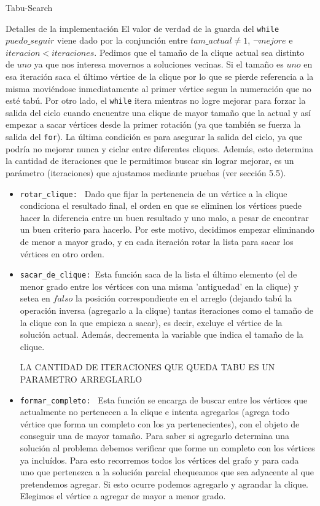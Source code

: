 \begin{section}{Tabu-Search}
\begin{subsection}{Detalles de la implementación}
		El valor de verdad de la guarda del \texttt{while} $puedo\_seguir$ viene dado por la conjunción entre $tam\_actual \neq 1$, $\neg mejore$ e $iteracion<iteraciones$.
		Pedimos que el tamaño de la clique actual sea distinto de $uno$ ya que nos interesa movernos a soluciones vecinas. Si el tamaño es $uno$ en esa iteración saca el último vértice de la clique por lo que se pierde referencia a la misma moviéndose inmediatamente al primer vértice segun la numeración que no esté tabú.
		Por otro lado, el \texttt{while} itera mientras no logre mejorar para forzar la salida del ciclo cuando encuentre una clique de mayor tamaño que la actual y así empezar a sacar vértices desde la primer rotación (ya que también se fuerza la salida del \texttt{for}).
		La última condición es para asegurar la salida del ciclo, ya que podría no mejorar nunca y ciclar entre diferentes cliques. Además, esto determina la cantidad de iteraciones que le permitimos buscar sin lograr mejorar, es un parámetro (iteraciones) que ajustamos mediante pruebas (ver sección 5.5).
		\begin{itemize}			
			\item \texttt{rotar\_clique: } Dado que fijar la pertenencia de un vértice a la clique condiciona el resultado final, el orden en que se eliminen los vértices puede hacer la diferencia entre un buen resultado y uno malo, a pesar de encontrar un buen criterio para hacerlo. Por este motivo, decidimos empezar eliminando de menor a mayor grado, y en cada iteración rotar la lista para sacar los vértices en otro orden.
			
			\item \texttt{sacar\_de\_clique: }Esta función saca de la lista el último elemento (el de menor grado entre los vértices con una misma 'antiguedad' en la clique) y setea en $falso$ la posición correspondiente en el arreglo (dejando tabú la operación inversa (agregarlo a la clique) tantas iteraciones como el tamaño de la clique con la que empieza a sacar), es decir, excluye el vértice de la solución actual. Además, decrementa la variable que indica el tamaño de la clique.

			LA CANTIDAD DE ITERACIONES QUE QUEDA TABU ES UN PARAMETRO ARREGLARLO
			
			\item \texttt{formar\_completo: } Esta función se encarga de buscar entre los vértices que actualmente no pertenecen a la clique e intenta agregarlos (agrega todo vértice que forma un completo con los ya pertenecientes), con el objeto de conseguir una de mayor tamaño. Para saber si agregarlo determina una solución al problema debemos verificar que forme un completo con los vértices ya incluídos. Para esto recorremos todos los vértices del grafo y para cada uno que pertenezca a la solución parcial chequeamos que sea adyacente al que pretendemos agregar. Si esto ocurre podemos agregarlo y agrandar la clique. Elegimos el vértice a agregar de mayor a menor grado.
			

\end{itemize}
\end{subsection}
\end{section}
